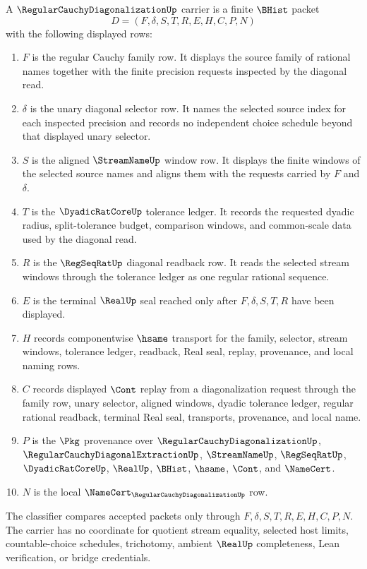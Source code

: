 \begin{definition}
\label{def:regular-cauchy-diagonalization-carrier}
A $\RegularCauchyDiagonalizationUp$ carrier is a finite $\BHist$ packet
$$
D=(F,\delta,S,T,R,E,H,C,P,N)
$$
with the following displayed rows:
\begin{enumerate}
\item $F$ is the regular Cauchy family row. It displays the source family of rational names together with the finite precision requests inspected by the diagonal read.
\item $\delta$ is the unary diagonal selector row. It names the selected source index for each inspected precision and records no independent choice schedule beyond that displayed unary selector.
\item $S$ is the aligned $\StreamNameUp$ window row. It displays the finite windows of the selected source names and aligns them with the requests carried by $F$ and $\delta$.
\item $T$ is the $\DyadicRatCoreUp$ tolerance ledger. It records the requested dyadic radius, split-tolerance budget, comparison windows, and common-scale data used by the diagonal read.
\item $R$ is the $\RegSeqRatUp$ diagonal readback row. It reads the selected stream windows through the tolerance ledger as one regular rational sequence.
\item $E$ is the terminal $\RealUp$ seal reached only after $F,\delta,S,T,R$ have been displayed.
\item $H$ records componentwise $\hsame$ transport for the family, selector, stream windows, tolerance ledger, readback, Real seal, replay, provenance, and local naming rows.
\item $C$ records displayed $\Cont$ replay from a diagonalization request through the family row, unary selector, aligned windows, dyadic tolerance ledger, regular rational readback, terminal Real seal, transports, provenance, and local name.
\item $P$ is the $\Pkg$ provenance over $\RegularCauchyDiagonalizationUp$, $\RegularCauchyDiagonalExtractionUp$, $\StreamNameUp$, $\RegSeqRatUp$, $\DyadicRatCoreUp$, $\RealUp$, $\BHist$, $\hsame$, $\Cont$, and $\NameCert$.
\item $N$ is the local $\NameCert_{\RegularCauchyDiagonalizationUp}$ row.
\end{enumerate}
The classifier compares accepted packets only through $F,\delta,S,T,R,E,H,C,P,N$. The carrier has no coordinate for quotient stream equality, selected host limits, countable-choice schedules, trichotomy, ambient $\RealUp$ completeness, Lean verification, or bridge credentials.
\end{definition}

